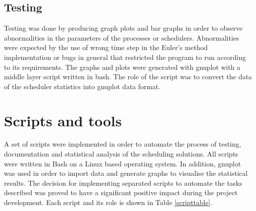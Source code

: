  
\subsection{Testing}
Testing was done by producing graph plots and bar graphs in order to observe abnormalities in the parameters of the processes or schedulers. Abnormalities were expected by the use of wrong time step in the Euler's method implementation or bugs in general that restricted the program to run according to its requirements.
The graphs and plots were generated with gnuplot with a middle layer script written in bash. The role of the script was to convert the data of the scheduler statistics into gnuplot data format.

\section{Scripts and tools}
A set of scripts were implemented in order to automate the process of testing, documentation and statistical analysis of the scheduling solutions. All scripts were written in Bash on a Linux based operating system. In addition, gnuplot was used in order to import data and generate graphs to visualise the statistical results.
The decision for implementing separated scripts to automate the tasks described was proved to have a significant positive impact during the project development. Each script and its role is shown in Table \ref{scripttable}.


